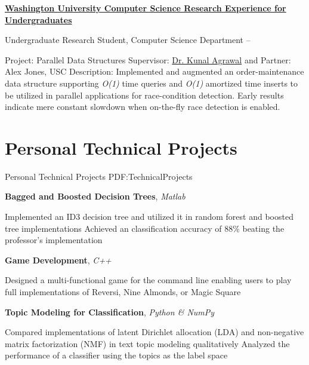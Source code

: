 \documentclass[a4paper,10pt,oneside]{article}
\begin{document}
\begin{body}
\href{http://reu.cse.wustl.edu/reu/Welcome.html}
{\textbf{Washington University Computer Science Research Experience for Undergraduates}}
\par
Undergraduate Research Student, Computer Science Department
\hfill
{} --
\begin{detail}
\BulletItem
Project:
Parallel Data Structures
\BulletItem
Supervisor:
\href{http://www.cse.wustl.edu/~kunal/}{Dr. Kunal Agrawal} and Partner: Alex Jones, USC
\BulletItem
Description:
Implemented and augmented an order-maintenance data structure supporting \textit{O(1)} time queries and \textit{O(1)} amortized time inserts to be utilized in parallel applications for race-condition detection.  Early results indicate mere constant slowdown when on-the-fly race detection is enabled.
\end{detail}



\section{Personal
\newline Technical
\newline Projects}
{Personal Technical Projects}
{PDF:TechnicalProjects}

\textbf{Bagged and Boosted Decision Trees},
\textit{Matlab}
\begin{detail}
\BulletItem
Implemented an ID3 decision tree and utilized it in random forest and boosted tree implementations
\BulletItem
Achieved an classification accuracy of 88\% beating the professor's implementation
\end{detail}

\EntryGap
\textbf{Game Development},
\textit{C++}
\begin{detail}
\BulletItem
Designed a multi-functional game for the command line enabling users to play full implementations of Reversi, Nine Almonds, or Magic Square
\end{detail}

\EntryGap
\textbf{Topic Modeling for Classification},
\textit{Python \& NumPy}
\begin{detail}
\BulletItem
Compared implementations of latent Dirichlet allocation (LDA) and non-negative matrix factorization (NMF) in text topic modeling qualitatively
\BulletItem
Analyzed the performance of a classifier using the topics as the label space
\end{detail}


\end{body}
\end{document}
